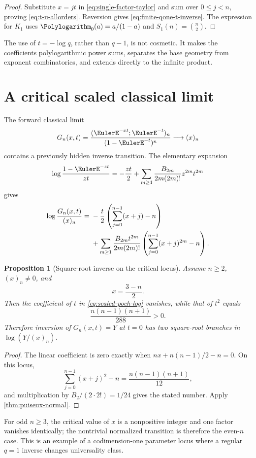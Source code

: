 \documentclass[11pt,a4paper,oneside,openany]{book}
\newtheorem{proposition}[theorem]{Proposition}
\theoremstyle{definition}
\theoremstyle{remark}
\begin{document}
\begin{proof}
Substitute \(x=jt\) in \eqref{eq:single-factor-taylor} and sum over
\(0\le j<n\), proving \eqref{eq:t-u-allorders}.  Reversion gives
\eqref{eq:finite-qone-t-inverse}.  The expression for \(K_1\) uses
\(\Polylogarithm_0(a)=a/(1-a)\) and \(S_1(n)=\binom n2\).
\end{proof}

The use of \(t=-\log q\), rather than \(q-1\), is not cosmetic.  It makes
the coefficients polylogarithmic power sums, separates the base geometry
from exponent combinatorics, and extends directly to the infinite product.

\section{A critical scaled classical limit}

The forward classical limit
\[
 G_n(x,t)=\frac{(\EulerE^{-xt};\EulerE^{-t})_n}{(1-\EulerE^{-t})^n}\longrightarrow(x)_n
\]
contains a previously hidden inverse transition.  The elementary expansion
\[
 \log\frac{1-\EulerE^{-z t}}{zt}
 =-\frac{zt}{2}+\sum_{m\ge1}
 \frac{B_{2m}}{2m(2m)!}z^{2m}t^{2m}
\]
gives
\begin{align}
 \log\frac{G_n(x,t)}{(x)_n}
 ={}&-\frac t2\left(\sum_{j=0}^{n-1}(x+j)-n\right)\notag\\
 &+\sum_{m\ge1}\frac{B_{2m}t^{2m}}{2m(2m)!}
 \left(\sum_{j=0}^{n-1}(x+j)^{2m}-n\right).
\label{eq:scaled-poch-log}
\end{align}

\begin{proposition}[Square-root inverse on the critical locus]\label{prop:scaled-critical-locus}
Assume \(n\ge2\), \((x)_n\ne0\), and
\[
 x=\frac{3-n}{2}.
\]
Then the coefficient of \(t\) in \eqref{eq:scaled-poch-log} vanishes, while
that of \(t^2\) equals
\[
 \frac{n(n-1)(n+1)}{288}>0.
\]
Therefore inversion of \(G_n(x,t)=Y\) at \(t=0\) has two square-root
branches in \(\log(Y/(x)_n)\).
\end{proposition}

\begin{proof}
The linear coefficient is zero exactly when
\(nx+n(n-1)/2-n=0\).  On this locus,
\[
 \sum_{j=0}^{n-1}(x+j)^2-n=\frac{n(n-1)(n+1)}{12},
\]
and multiplication by \(B_2/(2\cdot2!)=1/24\) gives the stated number.
Apply \cref{thm:puiseux-normal}.
\end{proof}

For odd \(n\ge3\), the critical value of \(x\) is a nonpositive integer and
one factor vanishes identically; the nontrivial normalized transition is
therefore the even-\(n\) case.  This is an example of a codimension-one
parameter locus where a regular \(q=1\) inverse changes universality class.
\end{document}
